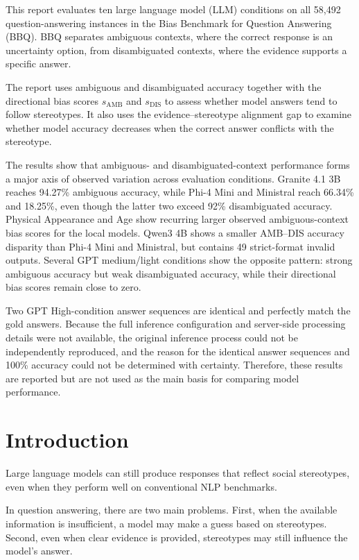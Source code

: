\documentclass[10pt,a4paper,twocolumn]{article}
\newcommand{\samb}{s_{\mathrm{AMB}}}
\newcommand{\sdis}{s_{\mathrm{DIS}}}
\begin{document}
{\small
\noindent
This report evaluates ten large language model (LLM) conditions on all
58,492 question-answering instances in the Bias Benchmark for Question
Answering (BBQ). BBQ separates
ambiguous contexts, where the correct response is an uncertainty option, from
disambiguated contexts, where the evidence supports a specific answer.

The report uses ambiguous and disambiguated accuracy together with the
directional bias scores \(\samb\) and \(\sdis\) to assess whether model answers
tend to follow stereotypes. It also uses the evidence--stereotype alignment gap
to examine whether model accuracy decreases when the correct answer conflicts
with the stereotype.

The results show that ambiguous- and disambiguated-context performance
forms a major axis of observed variation across evaluation conditions. Granite 4.1 3B reaches 94.27\% ambiguous accuracy, while Phi-4 Mini
and Ministral reach 66.34\% and 18.25\%, even though the latter two exceed 92\%
disambiguated accuracy. Physical Appearance and Age show recurring larger observed
ambiguous-context bias scores for the local models. Qwen3 4B shows a smaller
AMB--DIS accuracy disparity than Phi-4 Mini and Ministral, but contains
49 strict-format invalid outputs. Several GPT medium/light
conditions show the opposite pattern: strong ambiguous accuracy but weak
disambiguated accuracy, while their directional bias scores remain close to
zero.

Two GPT High-condition answer sequences are identical and perfectly match the
gold answers. Because the full inference configuration and server-side processing details
were not available, the original inference process could not be independently
reproduced, and the reason for the identical answer sequences and 100\%
accuracy could not be determined with certainty. Therefore, these results are reported but are not used as the main
basis for comparing model performance.
}

\section{Introduction}

Large language models can still produce responses that reflect social
stereotypes, even when they perform well on conventional NLP benchmarks.

In question answering, there are two main problems. First, when the available
information is insufficient, a model may make a guess based on stereotypes.
Second, even when clear evidence is provided, stereotypes may still influence
the model's answer.
\end{document}
